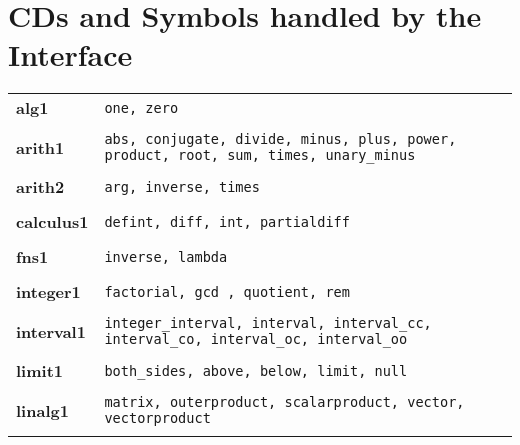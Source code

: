 \appendix

\chapter{CDs and Symbols handled by the Interface}

\begin{tabular}{p{2in} p{2in}}

{\bf alg1} & {\tt one, zero}\\ \\

{\bf arith1 } & {\tt abs, conjugate, divide, minus, plus, power, product, root, sum, times, unary\_minus}\\ \\

{\bf arith2 } & {\tt arg, inverse, times}\\ \\


{\bf calculus1} & {\tt defint, diff, int, partialdiff}\\ \\


{\bf fns1 }& {\tt inverse, lambda}\\ \\


{\bf integer1 }& {\tt factorial, gcd , quotient, rem}\\ \\


{\bf interval1 }& {\tt integer\_interval, interval, interval\_cc, interval\_co, interval\_oc, interval\_oo}\\ \\

{\bf limit1 }& {\tt both\_sides, above, below, limit, null}\\ \\

{\bf linalg1 }& {\tt matrix, outerproduct, scalarproduct, vector, vectorproduct}\\ \\

\end{tabular}


